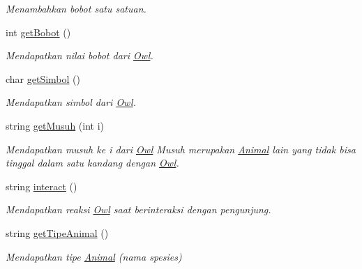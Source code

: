 \begin{DoxyCompactItemize}
\begin{DoxyCompactList}\small\item\em Menambahkan bobot satu satuan. \end{DoxyCompactList}\item 
int \hyperlink{classOwl_a97186cbd55b070213c8db7274d869a7f}{get\-Bobot} ()
\begin{DoxyCompactList}\small\item\em Mendapatkan nilai bobot dari \hyperlink{classOwl}{Owl}. \end{DoxyCompactList}\item 
char \hyperlink{classOwl_a27ffd4aaac71e68350d53f2f340ef4cb}{get\-Simbol} ()
\begin{DoxyCompactList}\small\item\em Mendapatkan simbol dari \hyperlink{classOwl}{Owl}. \end{DoxyCompactList}\item 
string \hyperlink{classOwl_a670f600b72e5fdb04e11511bd14f63d9}{get\-Musuh} (int i)
\begin{DoxyCompactList}\small\item\em Mendapatkan musuh ke i dari \hyperlink{classOwl}{Owl} Musuh merupakan \hyperlink{classAnimal}{Animal} lain yang tidak bisa tinggal dalam satu kandang dengan \hyperlink{classOwl}{Owl}. \end{DoxyCompactList}\item 
string \hyperlink{classOwl_acc0420063563e1d83d9ae7c3cff311c8}{interact} ()
\begin{DoxyCompactList}\small\item\em Mendapatkan reaksi \hyperlink{classOwl}{Owl} saat berinteraksi dengan pengunjung. \end{DoxyCompactList}\item 
string \hyperlink{classOwl_afbea38ace5450a7bde8caa813adbcfcd}{get\-Tipe\-Animal} ()
\begin{DoxyCompactList}\small\item\em Mendapatkan tipe \hyperlink{classAnimal}{Animal} (nama spesies) \end{DoxyCompactList}\end{DoxyCompactItemize}
